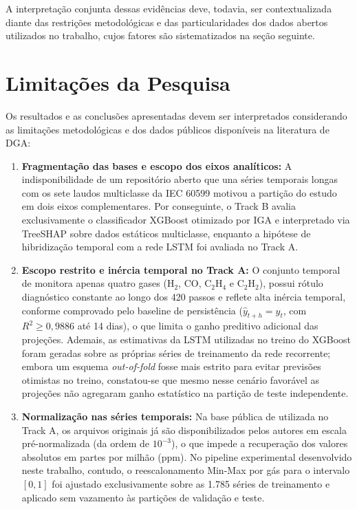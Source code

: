 A interpretação conjunta dessas evidências deve, todavia, ser contextualizada diante das restrições metodológicas e das particularidades dos dados abertos utilizados no trabalho, cujos fatores são sistematizados na seção seguinte.

\section{Limitações da Pesquisa}\label{sec:limitacoes_pesquisa}

Os resultados e as conclusões apresentadas devem ser interpretados considerando as limitações metodológicas e dos dados públicos disponíveis na literatura de DGA:

\begin{enumerate}
    \item \textbf{Fragmentação das bases e escopo dos eixos analíticos:} A indisponibilidade de um repositório aberto que una séries temporais longas com os sete laudos multiclasse da IEC 60599 motivou a partição do estudo em dois eixos complementares. Por conseguinte, o Track B avalia exclusivamente o classificador XGBoost otimizado por IGA e interpretado via TreeSHAP sobre dados estáticos multiclasse, enquanto a hipótese de hibridização temporal com a rede LSTM foi avaliada no Track A.
    \item \textbf{Escopo restrito e inércia temporal no Track A:} O conjunto temporal de  monitora apenas quatro gases ($\text{H}_2$, $\text{CO}$, $\text{C}_2\text{H}_4$ e $\text{C}_2\text{H}_2$), possui rótulo diagnóstico constante ao longo dos 420 passos e reflete alta inércia temporal, conforme comprovado pelo baseline de persistência ($\hat{y}_{t+h} = y_t$, com $R^2 \ge 0,9886$ até 14 dias), o que limita o ganho preditivo adicional das projeções. Ademais, as estimativas da LSTM utilizadas no treino do XGBoost foram geradas sobre as próprias séries de treinamento da rede recorrente; embora um esquema \textit{out-of-fold} fosse mais estrito para evitar previsões otimistas no treino, constatou-se que mesmo nesse cenário favorável as projeções não agregaram ganho estatístico na partição de teste independente.
    \item \textbf{Normalização nas séries temporais:} Na base pública de  utilizada no Track A, os arquivos originais já são disponibilizados pelos autores em escala pré-normalizada (da ordem de $10^{-3}$), o que impede a recuperação dos valores absolutos em partes por milhão (ppm). No pipeline experimental desenvolvido neste trabalho, contudo, o reescalonamento Min-Max por gás para o intervalo $[0, 1]$ foi ajustado exclusivamente sobre as 1.785 séries de treinamento e aplicado sem vazamento às partições de validação e teste.

\end{enumerate}
